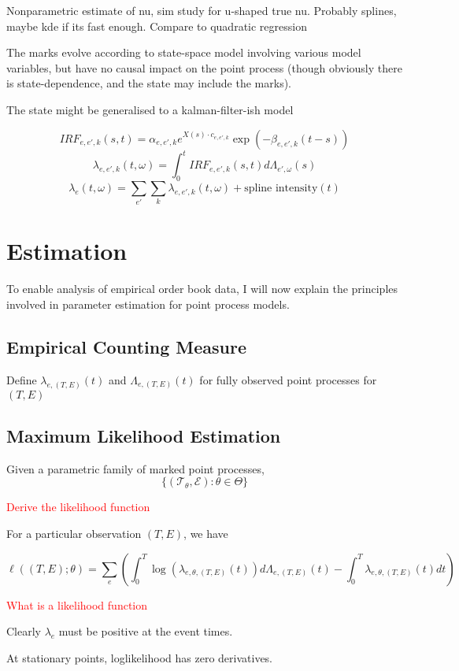 \documentclass[honours,12pt]{unswthesis}
\numberwithin{equation}{section}
\begin{document}
Nonparametric estimate of nu, sim study for u-shaped true nu. Probably splines, maybe kde if its fast enough. Compare to quadratic regression

The marks evolve according to state-space model involving various model variables, but have no causal impact on the point process (though obviously there is state-dependence, and the state may include the marks).

The state might be generalised to a kalman-filter-ish model \cite{SmithBrown}

$$IRF_{e,e',k}(s,t) = \alpha_{e,e',k} e^{X(s)\cdot c_{e,e',k}}\exp\left(-\beta_{e,e',k}(t-s)\right)$$
$$\lambda_{e,e',k}(t,\omega) = \int_0^t IRF_{e,e',k}(s,t) d\Lambda_{e',\omega}(s)$$
$$\lambda_e(t,\omega) = \sum_{e'} \sum_k \lambda_{e,e',k}(t,\omega) + \text{spline intensity}(t)$$


\chapter{Estimation}%

To enable analysis of empirical order book data, I will now explain the principles involved in parameter estimation for point process models.

\section{Empirical Counting Measure}
Define $\lambda_{e,(T,E)}(t)$ and $\Lambda_{e,(T,E)}(t)$ for fully observed point processes for $(T,E)$

\section{Maximum Likelihood Estimation}
Given a parametric family of marked point processes,
$$\{(\mathcal{T}_\theta,\mathcal{E}) : \theta\in\Theta\}$$


\textcolor{red}{Derive the likelihood function}

For a particular observation $(T,E)$, we have

$$\ell((T,E);\theta) = \sum_e \left(\int_0^T \log(\lambda_{e,\theta,(T,E)}(t))d\Lambda_{e,(T,E)}(t)-\int_0^T \lambda_{e,\theta,(T,E)}(t)dt\right)$$

\textcolor{red}{What is a likelihood function}


Clearly $\lambda_e$ must be positive at the event times.

At stationary points, loglikelihood has zero derivatives.
\end{document}
